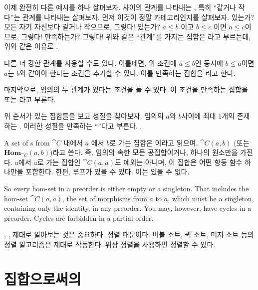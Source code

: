 이제 완전히 다른 예시를 하나 살펴보자.
 \trObject 사이의 관계를 나타내는 \trCategory, 특히 ``같거나 작다''는 관계를 나타내는  살펴보자.
먼저 이것이 정말 카테고리인지를 살펴보자. 
 있는가? 모든  자기 자신보다 같거나 작으므로, 그렇다!
 있는가? $a \leqslant b$ 이고 $b \leqslant c$ 이면 $a \leqslant c$이므로, 그렇다!
  만족하는가? 그렇다!
위와 같은 ``관계''를 가지는 집합은 \newterm{\trPreorder}라고 부르는데, 위와 같은 이유로  .

다른 더 강한 관계를 사용할 수도 있다. 이를테면, 위 조건에 $a \leqslant b$인 동시에 $b \leqslant a$이면 $a$는 $b$와 같아야 한다는 조건을 추가할 수 있다.
이를 만족하는 집합을 \newterm{\trPartialOrder}라고 한다.

마지막으로, 임의의 두  관계가 있다는 조건을 둘 수 있다.
이 조건을 만족하는 집합을 \newterm{\trLinearOrder} 또는 \newterm{\trTotalOrder}라고 부른다.

위 순서가 있는 집합들을  보고 성질을 찾아보자.
 임의의 \trObject $a$와 $b$사이에 최대 1개의  존재하는 .
이러한 성질을 만족하는  ``\trThin''다고 부른다.   .


A set of \trMorphism s from 
\trCategory  $\cat{C}$ 내에서 \trObject  $a$ 에서 \trObject  $b$로 가는  집합은
\newterm{\trHomSet}이라고 읽으며, $\cat{C}(a, b)$ (또는 $\mathbf{Hom}_{\cat{C}}(a, b)$)라고 쓴다. 
즉, 임의의  속한 모든  공집합이거나, 하나의 원소만을 가진다. 
$a$에서 $a$로 가는  집합인 $\cat{C}(a, a)$도 예외는 아니며, 이 집합은 어떤  항등 함수 하나만을 포함한다.
한편,  루프가 있을 수 있다. 이는  있을 수 없다.

So every hom-set in a preorder is either
empty or a singleton. That includes the hom-set $\cat{C}(a, a)$, the set of
morphisms from $a$ to $a$, which must be a singleton, containing only the
identity, in any preorder. You may, however, have cycles in a preorder.
Cycles are forbidden in a partial order.

\trPreorder, \trPartialOrder,  제대로 알아보는 것은 중요하다. 정렬 때문이다.
버블 소트, 퀵 소트, 머지 소트 등의 정렬 알고리즘은  제대로 작동한다.
 위상 정렬을 사용하면 정렬할 수 있다.

\section{집합으로써의 \trMonoid}

